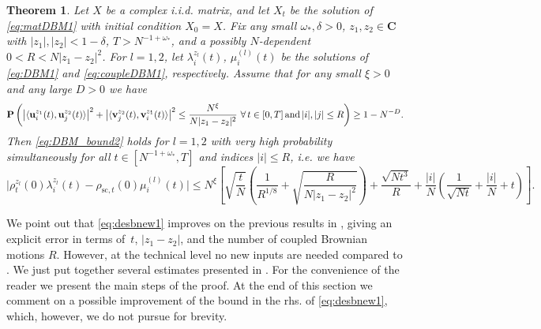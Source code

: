 \documentclass[10pt]{amsart}
\newtheorem{theorem}{Theorem}[section]
\numberwithin{equation}{section}
\newcommand{\dif}{\mathrm{d}}
\newcommand{\R}{\mathbf{R}}
\newcommand{\C}{\mathbf{C}}
\begin{document}
\begin{theorem}
\label{eq:maintheoDBM1}
Let $X$ be a complex i.i.d. matrix, and let $X_t$ be the solution of \eqref{eq:matDBM1} with initial condition $X_0=X$. Fix any small $\omega_*, \delta>0$, $z_1,z_2\in\C$ with $|z_1|,|z_2|<1-\delta$, $T>N^{-1+\omega_*}$, and a possibly $N$-dependent $0<R<N|z_1-z_2|^2$. For $l=1,2$, let $\lambda_i^{z_l}(t)$, $\mu_i^{(l)}(t)$ be the solutions of \eqref{eq:DBM1} and \eqref{eq:coupleDBM1}, respectively. Assume that for any small $\xi>0$ and any large $D>0$ we have
\begin{equation}
\label{eq:evectors1}
\mathbf{P}\left(\big|\langle {\bf u}_i^{z_1}(t),{\bf u}_j^{z_2}(t)\rangle\big|^2+\big|\langle {\bf v}_j^{z_2}(t), {\bf v}_i^{z_1}(t)\rangle\big|^2\le \frac{N^\xi}{N|z_1-z_2|^2} \,\, \forall\, t\in [0,T] \, \mathrm{and} \, |i|,|j|\le R\right)\ge 1-N^{-D}.
\end{equation}
Then \eqref{eq:DBM_bound2} holds for $l=1,2$ with very high probability simultaneously for all $t\in [N^{-1+\omega_*},T]$ and indices $|i|\le R$, i.e. we have
\begin{equation}
\label{eq:desbnew1}
\big|\rho_t^{z_l}(0)\lambda_i^{z_l}(t)-\rho_{\mathrm{sc},t}(0)\mu_i^{(l)}(t)\big|\le N^\xi\!\!\left[\sqrt{\frac{t}{N}}\left(\frac{1}{R^{1/8}}\!+\!\sqrt{\frac{R}{N|z_1-z_2|^2}}\right)\!+\!\frac{\sqrt{Nt^3}}{R}\!+\!\frac{|i|}{N}\left(\frac{1}{\sqrt{Nt}}\!+\!\frac{|i|}{N}+t\right)\!\right]\!.
\end{equation}
\end{theorem}

We point out that \eqref{eq:desbnew1} improves on the previous results in \cite{bourgade2024fluctuations, macroCLT_complex}, giving an explicit error in terms of~$t$, $|z_1-z_2|$, and the number of coupled Brownian motions $R$. However, at the technical level no new inputs are needed compared to \cite{bourgade2024fluctuations}. We just put together several estimates presented in \cite{bourgade2024fluctuations}. For the convenience of the reader we present the main steps of the proof. At the end of this section we comment on a possible improvement of the bound in the rhs. of \eqref{eq:desbnew1}, which, however, we do not pursue for brevity.
\end{document}
